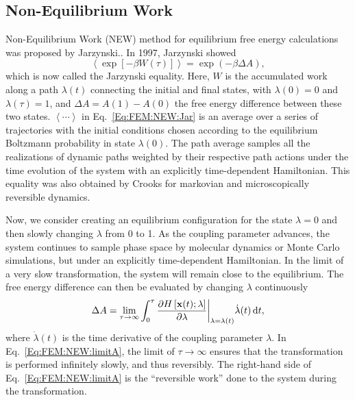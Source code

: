 \subsection{Non-Equilibrium Work\label{Sec:FEM:NEW}}
Non-Equilibrium Work (NEW) method for equilibrium free energy calculations was proposed by Jarzynski.\cite{JarzynskiPRL1997}. 
In 1997, Jarzynski showed
\begin{equation}
\left< \exp\left[-\beta W(\tau)\right] \right> = \exp{(-\beta \Delta A)},
\label{Eq:FEM:NEW:Jar}
\end{equation}
which is now called the Jarzynski equality. Here, $W$ is the accumulated work along a path $\lambda(t)$ connecting the initial and final states, with $\lambda(0)=0$ and $\lambda(\tau)=1$, and $\Delta A = A(1) - A(0)$ the free energy difference between these two states. 
$\left \langle \cdots \right \rangle$ in Eq.~\ref{Eq:FEM:NEW:Jar} is an average over a series of trajectories with the initial conditions chosen according to the equilibrium Boltzmann probability in state $\lambda(0)$. The path average samples all the realizations of dynamic paths weighted by their respective path actions under the time evolution of the system with an explicitly time-dependent Hamiltonian. This equality was also obtained by Crooks for markovian and microscopically reversible dynamics.\cite{CrooksJSP1998} 

Now, we consider creating an equilibrium configuration for the state $\lambda=0$ and then slowly changing $\lambda$ from 0 to 1. As the coupling parameter advances, the system continues to sample phase space by molecular dynamics or Monte Carlo simulations, but under an explicitly time-dependent Hamiltonian. In the limit of a very slow transformation, the system will remain close to the equilibrium. The free energy difference can then be evaluated by changing $\lambda$ continuously
\begin{equation}
\Delta A =\lim_{\tau\to\infty} \int_{0}^{\tau} {\frac{\partial{H\left[\textbf{x}(t);\lambda\right]}}{\partial{\lambda}}\bigg\rvert}_{\lambda=\lambda(t)} \dot{\lambda}(t) \mathop{}\!\mathrm{d} t,
\label{Eq:FEM:NEW:limitA}
\end{equation}  
where $\dot{\lambda}(t)$ is the time derivative of the coupling parameter $\lambda$. In Eq.~\ref{Eq:FEM:NEW:limitA}, the limit of $\tau\to\infty$ ensures that the transformation is performed infinitely slowly, and thus reversibly. The right-hand side of Eq.~\ref{Eq:FEM:NEW:limitA} is the ``reversible work'' done to the system during the transformation.

